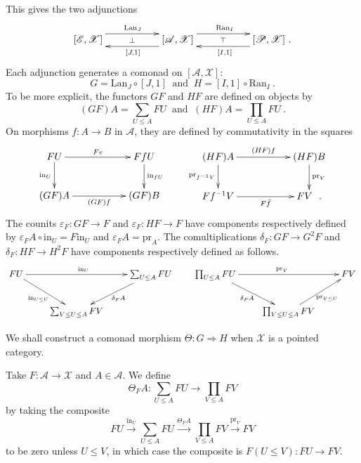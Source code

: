\documentclass[a4paper,12pt,reqno]{amsart}
\theoremstyle{definition}
\theoremstyle{fact}
\theoremstyle{genquest}
\theoremstyle{step}
\newcommand{\lra}{\longrightarrow}
\newcommand{\Lra}{\Longrightarrow}
\def\CA{{\mathscr A}}
\def\CE{{\mathscr E}}
\def\CP{{\mathscr P}}
\def\CX{{\mathscr X}}
\begin{document}
This gives the two adjunctions
\begin{equation}\label{twoadj} 
\xymatrix @R-3mm {
[\CE,\CX] \ar@<1.5ex>[rr]^{\mathrm{Lan}_J} \ar@{}[rr]|-{\bot} && [\CA,\CX]
\ar@<1.5ex>[rr]^{\mathrm{Ran}_I}  \ar@{}[rr]|-{\top} \ar@<1.5ex>[ll]^{[J,1]} && [\CP,\CX]
\ar@<1.5ex>[ll]^{[I,1]}  \ .
}
\end{equation}
Each adjunction generates a comonad on $[\CA,\CX]$:
\begin{equation}\label{twocmnd}
G = \mathrm{Lan}_J \circ [J,1] \ \text{ and } \  H = [I,1] \circ \mathrm{Ran}_I \ .
\end{equation}
To be more explicit, the functors $GF$ and $HF$ are defined on objects by 
$$(GF)A=\sum_{U\le A}{FU} \ \text{ and } \ (HF)A=\prod_{U\le A}{FU} \ .$$ 
On morphisms $f:A\lra B$ in $\CA$, they are defined by commutativity in the squares
\begin{equation}
\begin{aligned}
\xymatrix{
FU \ar[rr]^-{Fe} \ar[d]_-{\mathrm{in}_U} && FfU \ar[d]^-{\mathrm{in}_{fU}} \\
(GF)A \ar[rr]_-{(GF)f} && (GF)B}
\qquad
\xymatrix{
(HF)A \ar[rr]^-{(HF)f} \ar[d]_-{\mathrm{pr}_{f^{-1}V}} && (HF)B \ar[d]^-{\mathrm{pr}_V} \\
Ff^{-1}V \ar[rr]_-{F\bar{f}} && FV \ \ .}
\end{aligned}
\end{equation}
The counits $\varepsilon_F : GF \lra F$ and $\varepsilon_F : HF \lra F$ have
components respectively defined by $\varepsilon_FA \circ \mathrm{in}_U = F\mathrm{in}_U$
and $\varepsilon_FA = \mathrm{pr}_A$. 
The comultiplications $\delta_F : GF\lra G^2F$ and $\delta_F : HF\lra H^2F$ 
have components respectively defined as follows.
\begin{equation*}
\xymatrix{
FU \ar[rd]_{\mathrm{in}_{U\le U}}\ar[rr]^{\mathrm{in}_U}   && \sum_{U\le A}{FU} \ar[ld]^{\delta_FA} \\
& \sum_{V\le U\le A}{FV}  &
}
\qquad
\xymatrix{
\prod_{U\le A}{FU} \ar[rd]_{\delta_FA}\ar[rr]^{\mathrm{pr}_{V}}   && FV  \\
& \prod_{V\le U\le A}{FV}\ar[ru]_{\mathrm{pr}_{V\le U}}  &
}
\end{equation*}


We shall construct a comonad morphism $\Theta : G \Lra H$ when $\CX$ is a pointed
category.

Take $F : \CA \lra \CX$ and $A\in \CA$. We define 
\begin{equation}\label{Thetacmpnt}
\Theta_FA : \sum_{U\le A}FU \lra \prod_{V\le A}FV
\end{equation}
by taking the composite
$$ FU\stackrel{\mathrm{in}_U}\lra \sum_{U\le A}{FU} \stackrel{\Theta_FA}\lra \prod_{V\le A}{FV} \stackrel{\mathrm{pr}_V}\lra FV$$
to be zero unless $U\le V$, in which case the composite is $F(U\le V) : FU \lra FV$.
\end{document}
